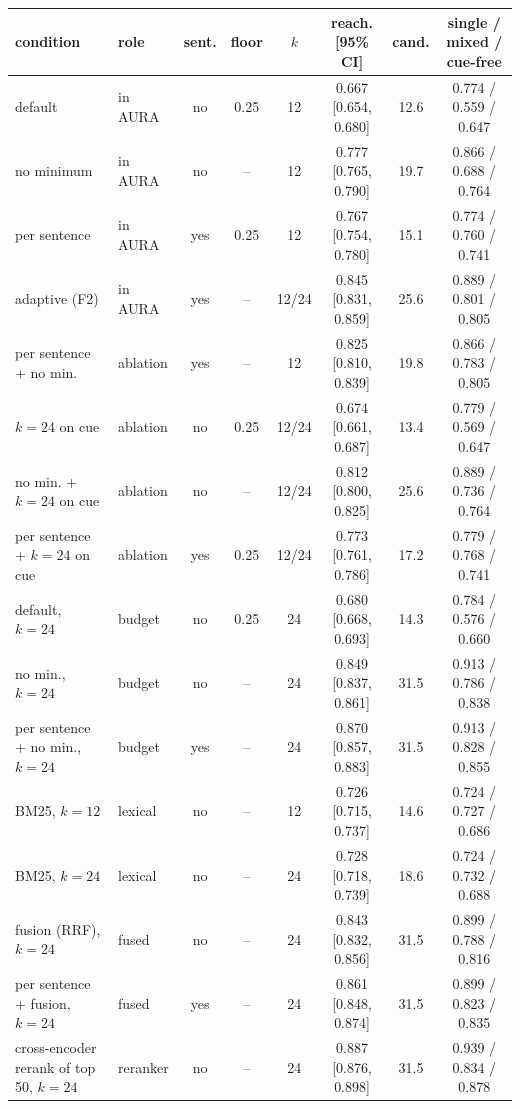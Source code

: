 \begin{tabular}{llcccccc}
\toprule
condition & role & sent. & floor & $k$ & reach. [95\% CI] & cand. & single / mixed / cue-free \\
\midrule
default & in AURA & no & 0.25 & 12 & 0.667 [0.654, 0.680] & 12.6 & 0.774 / 0.559 / 0.647 \\
no minimum & in AURA & no & -- & 12 & 0.777 [0.765, 0.790] & 19.7 & 0.866 / 0.688 / 0.764 \\
per sentence & in AURA & yes & 0.25 & 12 & 0.767 [0.754, 0.780] & 15.1 & 0.774 / 0.760 / 0.741 \\
adaptive (F2) & in AURA & yes & -- & 12/24 & 0.845 [0.831, 0.859] & 25.6 & 0.889 / 0.801 / 0.805 \\
per sentence + no min. & ablation & yes & -- & 12 & 0.825 [0.810, 0.839] & 19.8 & 0.866 / 0.783 / 0.805 \\
$k{=}24$ on cue & ablation & no & 0.25 & 12/24 & 0.674 [0.661, 0.687] & 13.4 & 0.779 / 0.569 / 0.647 \\
no min. + $k{=}24$ on cue & ablation & no & -- & 12/24 & 0.812 [0.800, 0.825] & 25.6 & 0.889 / 0.736 / 0.764 \\
per sentence + $k{=}24$ on cue & ablation & yes & 0.25 & 12/24 & 0.773 [0.761, 0.786] & 17.2 & 0.779 / 0.768 / 0.741 \\
default, $k{=}24$ & budget & no & 0.25 & 24 & 0.680 [0.668, 0.693] & 14.3 & 0.784 / 0.576 / 0.660 \\
no min., $k{=}24$ & budget & no & -- & 24 & 0.849 [0.837, 0.861] & 31.5 & 0.913 / 0.786 / 0.838 \\
per sentence + no min., $k{=}24$ & budget & yes & -- & 24 & 0.870 [0.857, 0.883] & 31.5 & 0.913 / 0.828 / 0.855 \\
BM25, $k{=}12$ & lexical & no & -- & 12 & 0.726 [0.715, 0.737] & 14.6 & 0.724 / 0.727 / 0.686 \\
BM25, $k{=}24$ & lexical & no & -- & 24 & 0.728 [0.718, 0.739] & 18.6 & 0.724 / 0.732 / 0.688 \\
fusion (RRF), $k{=}24$ & fused & no & -- & 24 & 0.843 [0.832, 0.856] & 31.5 & 0.899 / 0.788 / 0.816 \\
per sentence + fusion, $k{=}24$ & fused & yes & -- & 24 & 0.861 [0.848, 0.874] & 31.5 & 0.899 / 0.823 / 0.835 \\
cross-encoder rerank of top 50, $k{=}24$ & reranker & no & -- & 24 & 0.887 [0.876, 0.898] & 31.5 & 0.939 / 0.834 / 0.878 \\
\bottomrule
\end{tabular}
